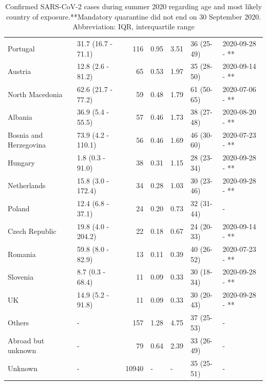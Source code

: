 \documentclass[10pt, a4paper, twoside]{article}
\begin{document}
\begin{table}
\begin{tabular}{llrllll}
  Portugal & 31.7 (16.7 - 71.1) & 116 & 0.95 & 3.51 & 36 (25-49) & 2020-09-28 - ** \\ 
  Austria & 12.8 (2.6 - 81.2) &  65 & 0.53 & 1.97 & 35 (28-50) & 2020-09-14 - ** \\ 
  North Macedonia & 62.6 (21.7 - 77.2) &  59 & 0.48 & 1.79 & 61 (50-65) & 2020-07-06 - ** \\ 
  Albania & 36.9 (5.4 - 55.5) &  57 & 0.46 & 1.73 & 38 (27-48) & 2020-08-20 - ** \\ 
  Bosnia and Herzegovina & 73.9 (4.2 - 110.1) &  56 & 0.46 & 1.69 & 46 (30-60) & 2020-07-23 - ** \\ 
  Hungary & 1.8 (0.3 - 91.0) &  38 & 0.31 & 1.15 & 28 (23-34) & 2020-09-28 - ** \\ 
  Netherlands & 15.8 (3.0 - 172.4) &  34 & 0.28 & 1.03 & 30 (23-46) & 2020-09-28 - ** \\ 
  Poland & 12.4 (6.8 - 37.1) &  24 & 0.20 & 0.73 & 32 (31-44) &  -  \\ 
  Czech Republic & 19.8 (4.0 - 204.2) &  22 & 0.18 & 0.67 & 24 (20-33) & 2020-09-14 - ** \\ 
  Romania & 59.8 (8.0 - 82.9) &  13 & 0.11 & 0.39 & 40 (26-52) & 2020-07-23 - ** \\ 
  Slovenia & 8.7 (0.3 - 68.4) &  11 & 0.09 & 0.33 & 30 (18-34) & 2020-09-28 - ** \\ 
  UK & 14.9 (5.2 - 91.8) &  11 & 0.09 & 0.33 & 30 (20-43) & 2020-09-28 - ** \\ 
  Others &  -  & 157 & 1.28 & 4.75 & 37 (25-53) &  -  \\ 
  Abroad but unknown &  -  &  79 & 0.64 & 2.39 & 33 (26-49) &  -  \\ 
  Unknown &  -  & 10940 &  -  &  -  & 35 (25-51) &  -  \\ 
   \hline
\end{tabular}
\endgroup
\caption{Confirmed SARS-CoV-2 cases during summer 2020 regarding age and most likely country of exposure.**Mandatory quarantine did not end on 30 September 2020. Abbreviation: IQR, interquartile range} 
\label{t2}
\end{table}
\end{document}
